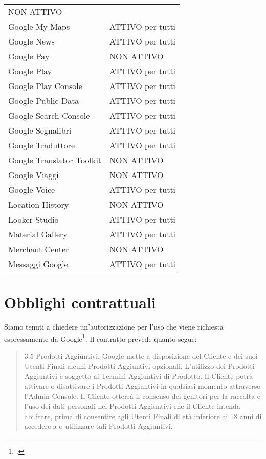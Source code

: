 \begin{center}
\begin{tabular}{ll}
NON ATTIVO\\
Google My Maps&
ATTIVO per tutti\\
Google News&
ATTIVO per tutti\\
Google Pay&
NON ATTIVO\\
Google Play&
ATTIVO per tutti\\
Google Play Console&
ATTIVO per tutti\\
Google Public Data&
ATTIVO per tutti\\
Google Search Console&
ATTIVO per tutti\\
Google Segnalibri&
ATTIVO per tutti\\
Google Traduttore&
ATTIVO per tutti\\
Google Translator Toolkit&
NON ATTIVO\\
Google Viaggi&
NON ATTIVO\\
Google Voice&
ATTIVO per tutti\\
Location History&
NON ATTIVO\\
Looker Studio&
ATTIVO per tutti\\
Material Gallery&
ATTIVO per tutti\\
Merchant Center&
NON ATTIVO\\
Messaggi Google&
ATTIVO per tutti\\
\bottomrule
\end{tabular}
\end{center}
\section{Obblighi contrattuali}
Siamo tenuti a chiedere un'autorizzazione per l'uso che viene richiesta espressamente da Google\footcite{Google2020}. Il contratto prevede quanto segue:
\begin{quotation}
3.5 Prodotti Aggiuntivi. Google mette a disposizione del Cliente e dei suoi Utenti Finali alcuni Prodotti Aggiuntivi opzionali. L’utilizzo dei Prodotti Aggiuntivi è soggetto ai Termini Aggiuntivi di Prodotto. Il Cliente potrà attivare o disattivare i Prodotti Aggiuntivi in qualsiasi momento attraverso l’Admin Console. Il Cliente otterrà il consenso dei genitori per la raccolta e l’uso dei dati personali nei Prodotti Aggiuntivi che il Cliente intenda abilitare, prima di consentire agli Utenti Finali di età inferiore ai 18 anni di accedere a o utilizzare tali Prodotti Aggiuntivi.
\end{quotation}
